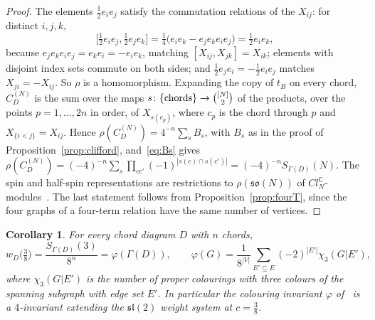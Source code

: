 \documentclass[11pt,a4paper,reqno]{amsart}
\newtheorem{corollary}[theorem]{Corollary}
\theoremstyle{definition}
\newcommand{\slt}{\mathfrak{sl}(2)}
\newcommand{\binomset}[2]{\tbinom{#1}{#2}}
\begin{document}
\begin{proof}
The elements $\frac12e_ie_j$ satisfy the commutation relations of the $X_{ij}$: for distinct $i,j,k$,
\[
\bigl[\tfrac12e_ie_j,\tfrac12e_je_k\bigr]=\tfrac14\bigl(e_ie_k-e_je_ke_ie_j\bigr)=\tfrac12e_ie_k,
\]
because $e_je_ke_ie_j=e_ke_i=-e_ie_k$, matching $[X_{ij},X_{jk}]=X_{ik}$; elements with disjoint index sets commute on both sides; and $\frac12e_je_i=-\frac12e_ie_j$ matches $X_{ji}=-X_{ij}$. So $\rho$ is a homomorphism. Expanding the copy of $t_B$ on every chord, $C^{(N)}_D$ is the sum over the maps $s\colon\{\text{chords}\}\to\binomset{[N]}{2}$ of the products, over the points $p=1,\dots,2n$ in order, of $X_{s(c_p)}$, where $c_p$ is the chord through $p$ and $X_{\{i<j\}}=X_{ij}$. Hence $\rho(C^{(N)}_D)=4^{-n}\sum_sB_s$, with $B_s$ as in the proof of Proposition~\ref{prop:clifford}, and~\eqref{eq:Bs} gives $\rho(C^{(N)}_D)=(-4)^{-n}\sum_s\prod_{cc'}(-1)^{|s(c)\cap s(c')|}=(-4)^{-n}S_{\Gamma(D)}(N)$. The spin and half-spin representations are restrictions to $\rho(\mathfrak{so}(N))$ of $Cl_N^{\mathbb C}$-modules~\cite[Lecture~20]{FH91}. The last statement follows from Proposition~\ref{prop:fourT}, since the four graphs of a four-term relation have the same number of vertices.
\end{proof}

\begin{corollary}\label{cor:threeeighths}
For every chord diagram $D$ with $n$ chords,
\[
w_D\bigl(\tfrac38\bigr)=\frac{S_{\Gamma(D)}(3)}{8^n}=\varphi(\Gamma(D)),\qquad \varphi(G)=\frac{1}{8^{|V|}}\sum_{E'\subseteq E}(-2)^{|E'|}\chi_3(G|E'),
\]
where $\chi_3(G|E')$ is the number of proper colourings with three colours of the spanning subgraph with edge set $E'$. In particular the colouring invariant $\varphi$ of~\cite{FK25} is a $4$-invariant extending the $\slt$ weight system at $c=\frac38$.
\end{corollary}
\end{document}
